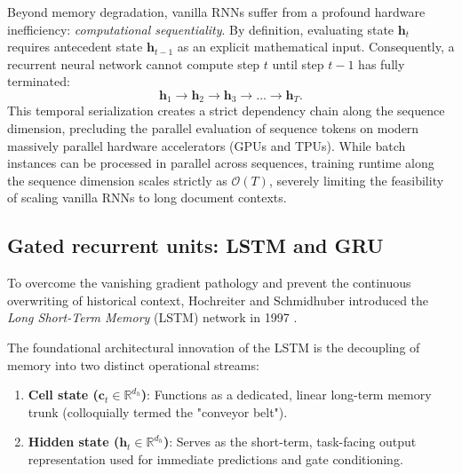 \documentclass[../../main.tex]{subfiles}
\begin{document}
Beyond memory degradation, vanilla RNNs suffer from a profound hardware inefficiency: \textit{computational sequentiality}. By definition, evaluating state $\mathbf{h}_t$ requires antecedent state $\mathbf{h}_{t-1}$ as an explicit mathematical input. Consequently, a recurrent neural network cannot compute step $t$ until step $t-1$ has fully terminated:
\begin{equation}
\mathbf{h}_1 \longrightarrow \mathbf{h}_2 \longrightarrow \mathbf{h}_3 \longrightarrow \dots \longrightarrow \mathbf{h}_T.
\end{equation}
This temporal serialization creates a strict dependency chain along the sequence dimension, precluding the parallel evaluation of sequence tokens on modern massively parallel hardware accelerators (GPUs and TPUs). While batch instances can be processed in parallel across sequences, training runtime along the sequence dimension scales strictly as $\mathcal{O}(T)$, severely limiting the feasibility of scaling vanilla RNNs to long document contexts.

\subsection{Gated recurrent units: LSTM and GRU}
\label{subsec:rnn_gated_architectures}

To overcome the vanishing gradient pathology and prevent the continuous overwriting of historical context, Hochreiter and Schmidhuber introduced the \textit{Long Short-Term Memory} (LSTM) network in 1997 \citep{hochreiter1997}.

The foundational architectural innovation of the LSTM is the decoupling of memory into two distinct operational streams:
\begin{enumerate}
    \item \textbf{Cell state ($\mathbf{c}_t \in \mathbb{R}^{d_h}$)}: Functions as a dedicated, linear long-term memory trunk (colloquially termed the "conveyor belt").
    \item \textbf{Hidden state ($\mathbf{h}_t \in \mathbb{R}^{d_h}$)}: Serves as the short-term, task-facing output representation used for immediate predictions and gate conditioning.
\end{enumerate}
\end{document}
